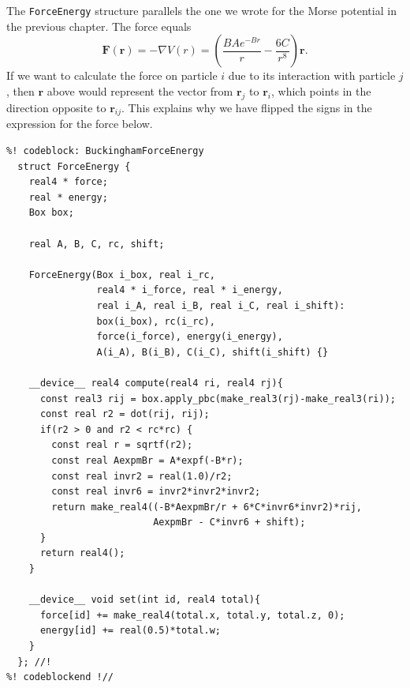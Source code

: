 The \texttt{ForceEnergy} structure parallels the one we wrote for the Morse 
potential in the previous chapter. The force equals
\begin{equation*}
  \mathbf{F}(\mathbf{r})
    = -\nabla V(r)
    = \left(\frac{BAe^{-Br}}{r} - \frac{6C}{r^8}\right) \mathbf{r}.
\end{equation*}
If we want to calculate the force on particle $i$ due to its interaction with 
particle $j$, then $\mathbf{r}$ above would represent the vector from 
$\mathbf{r}_j$ to $\mathbf{r}_i$, which points in the direction opposite to 
$\mathbf{r}_{ij}$. This explains why we have flipped the signs in the 
expression for the force below.
\begin{lstlisting}
%! codeblock: BuckinghamForceEnergy
  struct ForceEnergy {
    real4 * force;
    real * energy;
    Box box;

    real A, B, C, rc, shift;

    ForceEnergy(Box i_box, real i_rc,
                real4 * i_force, real * i_energy,
                real i_A, real i_B, real i_C, real i_shift):
                box(i_box), rc(i_rc),
                force(i_force), energy(i_energy),
                A(i_A), B(i_B), C(i_C), shift(i_shift) {}

    __device__ real4 compute(real4 ri, real4 rj){
      const real3 rij = box.apply_pbc(make_real3(rj)-make_real3(ri));
      const real r2 = dot(rij, rij);
      if(r2 > 0 and r2 < rc*rc) {
        const real r = sqrtf(r2);
        const real AexpmBr = A*expf(-B*r);
        const real invr2 = real(1.0)/r2;
        const real invr6 = invr2*invr2*invr2;
        return make_real4((-B*AexpmBr/r + 6*C*invr6*invr2)*rij,
                          AexpmBr - C*invr6 + shift);
      }
      return real4();
    }

    __device__ void set(int id, real4 total){
      force[id] += make_real4(total.x, total.y, total.z, 0);
      energy[id] += real(0.5)*total.w;
    }
  }; //!
%! codeblockend !//
\end{lstlisting}

